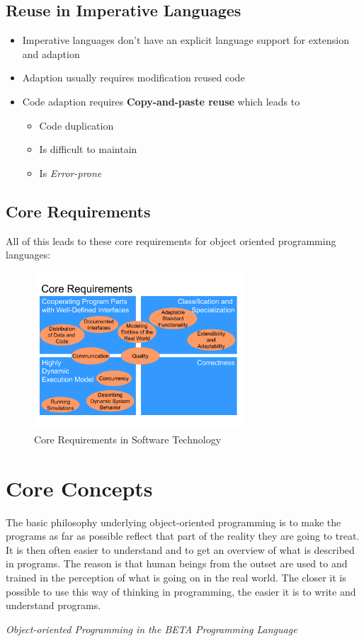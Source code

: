 \subsection{Reuse in Imperative Languages}
\begin{itemize}
 \item Imperative languages don't have an explicit language support for extension and adaption
 \item Adaption usually requires modification reused code
 \item Code adaption requires \textbf{Copy-and-paste reuse} which leads to
  \begin{itemize}
   \item Code duplication
   \item Is difficult to maintain
   \item Is \emph{Error-prone}
  \end{itemize}

\end{itemize}

\subsection{Core Requirements}
All of this leads to these core requirements for object oriented programming languages:
\begin{figure}[h!]
  \centering
    \includegraphics[width=0.7\textwidth]{img/01_core_requirements}
      \caption{Core Requirements in Software Technology}
\end{figure}

\section{Core Concepts}
\begin{shadequote}
The basic philosophy underlying object-oriented
programming is to make the programs as far as
possible reflect that part of the reality they are going
to treat. It is then often easier to understand and to
get an overview of what is described in programs.
The reason is that human beings from the outset are
used to and trained in the perception of what is going
on in the real world. The closer it is possible to use
this way of thinking in programming, the easier it is to
write and understand programs.\par\emph{Object-oriented Programming in the BETA Programming Language}
\end{shadequote}
